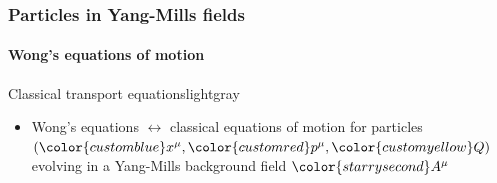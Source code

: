 \documentclass[aspectratio=169,11pt,usenames,dvipsnames]{beamer}
\begin{document}

\begin{frame}
    \frametitle{Particles in Yang-Mills fields}
    \framesubtitle{Wong's equations of motion}
   \begin{center}
    \begin{custombox2}{Classical transport equations}{lightgray}
        \small
        \begin{varwidth}{0.68\textwidth}
        \begin{itemize}\itemsep0em 
            \item {\color{palteal}Wong's equations} $\leftrightarrow$ classical equations of motion for particles\\
            $({\color{customblue}x^\mu},{\color{customred}p^\mu},{\color{customyellow}Q})$ evolving in a Yang-Mills background field ${\color{starrysecond}A^\mu}$
        \end{itemize}
        \end{varwidth}
    \end{custombox2}


\end{center}
\end{frame}
\end{document}
